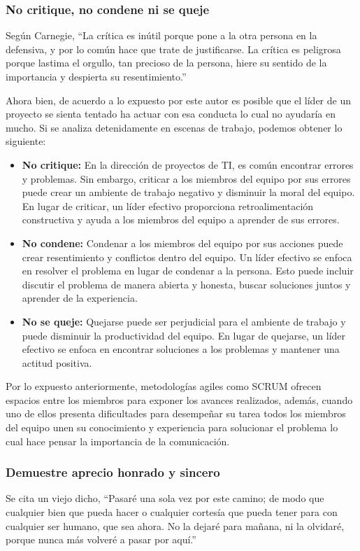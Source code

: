 \documentclass[journal]{IEEEtran}
\begin{document}
\subsubsection{No critique, no condene ni se queje}
Según Carnegie, “La crítica es inútil porque pone a la otra persona en la defensiva, y por lo común hace que trate de justificarse. La crítica es peligrosa porque lastima el orgullo, tan precioso de la persona, hiere su sentido de la importancia y despierta su resentimiento.”

Ahora bien, de acuerdo a lo expuesto por este autor es posible que el líder de un proyecto se sienta tentado ha actuar con esa conducta lo cual no ayudaría en mucho. Si se analiza detenidamente en escenas de trabajo, podemos obtener lo siguiente:

\begin{itemize}
	\item \textbf{No critique:} En la dirección de proyectos de TI, es común encontrar errores y problemas. Sin embargo, criticar a los miembros del equipo por sus errores puede crear un ambiente de trabajo negativo y disminuir la moral del equipo. En lugar de criticar, un líder efectivo proporciona retroalimentación constructiva y ayuda a los miembros del equipo a aprender de sus errores.
	\item \textbf{No condene:} Condenar a los miembros del equipo por sus acciones puede crear resentimiento y conflictos dentro del equipo. Un líder efectivo se enfoca en resolver el problema en lugar de condenar a la persona. Esto puede incluir discutir el problema de manera abierta y honesta, buscar soluciones juntos y aprender de la experiencia.
	\item \textbf{No se queje: }Quejarse puede ser perjudicial para el ambiente de trabajo y puede disminuir la productividad del equipo. En lugar de quejarse, un líder efectivo se enfoca en encontrar soluciones a los problemas y mantener una actitud positiva.
\end{itemize}

Por lo expuesto anteriormente, metodologías agiles como SCRUM ofrecen espacios entre los miembros para exponer los avances realizados, además, cuando uno de ellos presenta dificultades para desempeñar su tarea todos los miembros del equipo unen su conocimiento y experiencia para solucionar el problema lo cual hace pensar la importancia de la comunicación.

\subsubsection{Demuestre aprecio honrado y sincero}
Se cita un viejo dicho, “Pasaré una sola vez por este camino; de modo que cualquier bien que pueda hacer o cualquier cortesía que pueda tener para con cualquier ser humano, que sea ahora. No la dejaré para mañana, ni la olvidaré, porque nunca más volveré a pasar por aquí.”
\end{document}
